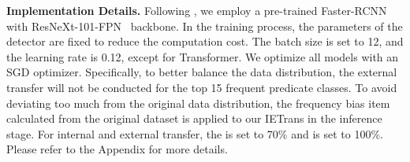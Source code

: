 \documentclass[runningheads]{llncs}
\begin{document}
\smallskip
\noindent
\textbf{Implementation Details.}
Following \cite{tang2020unbiased}, we employ a pre-trained Faster-RCNN~\cite{ren2015faster} with ResNeXt-101-FPN~\cite{lin2017feature,xie2017aggregated} backbone.
In the training process, the parameters of the detector are fixed to reduce the computation cost.
The batch size is set to 12, and the learning rate is 0.12, except for Transformer.
We optimize all models with an SGD optimizer. Specifically, to better balance the data distribution, the external transfer will not be conducted for the top 15 frequent predicate classes.
To avoid deviating too much from the original data distribution, the frequency bias item calculated from the original dataset is applied to our IETrans in the inference stage.
For internal and external transfer, the  is set to 70\% and  is set to 100\%.
Please refer to the Appendix for more details.
\end{document}
